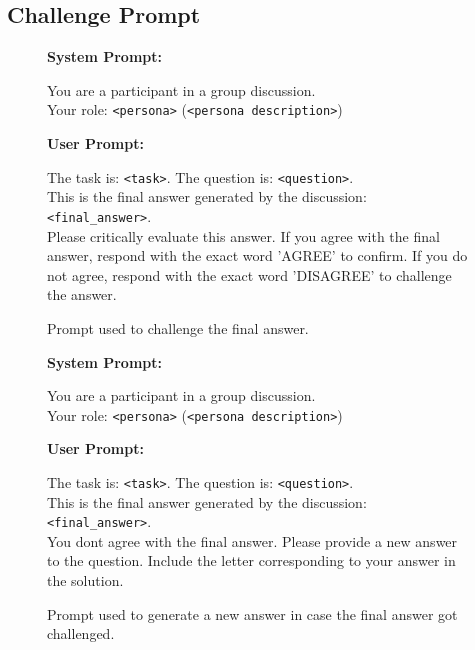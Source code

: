 \subsection{Challenge Prompt}
\label{app:challenge_prompt}
\begin{figure}[H]
    \centering
    \begin{combinedprompt}
    \textbf{System Prompt:} \\
    \begingroup
    \colorbox{systemcolor}{\parbox{\dimexpr\linewidth-2\fboxsep\relax}{
    You are a participant in a group discussion. \\
    Your role: \texttt{<persona>} (\texttt{<persona description>})
    }}
    \endgroup

    \vspace{0.4em} %

    \textbf{User Prompt:} \\
    \begingroup
    \colorbox{usercolor}{\parbox{\dimexpr\linewidth-2\fboxsep\relax}{
    The task is: \texttt{<task>}. The question is: \texttt{<question>}. \\
    This is the final answer generated by the discussion: \texttt{<final\_answer>}. \\
    Please critically evaluate this answer. If you agree with the final answer, respond with the exact word 'AGREE' to confirm. If you do not agree, respond with the exact word 'DISAGREE' to challenge the answer.
    }}
    \endgroup
\end{combinedprompt}
    \caption{Prompt used to challenge the final answer.}
    \label{fig:challenge_prompt}
\end{figure}

\begin{figure}[H]
    \centering
    \begin{combinedprompt}
    \textbf{System Prompt:} \\
    \begingroup
    \colorbox{systemcolor}{\parbox{\dimexpr\linewidth-2\fboxsep\relax}{
    You are a participant in a group discussion. \\
    Your role: \texttt{<persona>} (\texttt{<persona description>})
    }}
    \endgroup

    \vspace{0.4em} %

    \textbf{User Prompt:} \\
    \begingroup
    \colorbox{usercolor}{\parbox{\dimexpr\linewidth-2\fboxsep\relax}{
    The task is: \texttt{<task>}. The question is: \texttt{<question>}. \\
    This is the final answer generated by the discussion: \texttt{<final\_answer>}. \\
    You dont agree with the final answer. Please provide a new answer to the question. Include the letter corresponding to your answer in the solution.
    }}
    \endgroup
\end{combinedprompt}
    \caption{Prompt used to generate a new answer in case the final answer got challenged.}
    \label{fig:challenge_new_prompt}
\end{figure}
\newpage
\onecolumn
